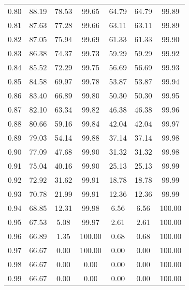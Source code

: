 \begin{tabular}{|c|c|c|c|c|c|c|}
      0.80 &     88.19 &     78.53 &      99.65 &   64.79 &      64.79 &         99.89 \\
      0.81 &     87.63 &     77.28 &      99.66 &   63.11 &      63.11 &         99.89 \\
      0.82 &     87.05 &     75.94 &      99.69 &   61.33 &      61.33 &         99.90 \\
      0.83 &     86.38 &     74.37 &      99.73 &   59.29 &      59.29 &         99.92 \\
      0.84 &     85.52 &     72.29 &      99.75 &   56.69 &      56.69 &         99.93 \\
      0.85 &     84.58 &     69.97 &      99.78 &   53.87 &      53.87 &         99.94 \\
      0.86 &     83.40 &     66.89 &      99.80 &   50.30 &      50.30 &         99.95 \\
      0.87 &     82.10 &     63.34 &      99.82 &   46.38 &      46.38 &         99.96 \\
      0.88 &     80.66 &     59.16 &      99.84 &   42.04 &      42.04 &         99.97 \\
      0.89 &     79.03 &     54.14 &      99.88 &   37.14 &      37.14 &         99.98 \\
      0.90 &     77.09 &     47.68 &      99.90 &   31.32 &      31.32 &         99.98 \\
      0.91 &     75.04 &     40.16 &      99.90 &   25.13 &      25.13 &         99.99 \\
      0.92 &     72.92 &     31.62 &      99.91 &   18.78 &      18.78 &         99.99 \\
      0.93 &     70.78 &     21.99 &      99.91 &   12.36 &      12.36 &         99.99 \\
      0.94 &     68.85 &     12.31 &      99.98 &    6.56 &       6.56 &        100.00 \\
      0.95 &     67.53 &      5.08 &      99.97 &    2.61 &       2.61 &        100.00 \\
      0.96 &     66.89 &      1.35 &     100.00 &    0.68 &       0.68 &        100.00 \\
      0.97 &     66.67 &      0.00 &     100.00 &    0.00 &       0.00 &        100.00 \\
      0.98 &     66.67 &      0.00 &       0.00 &    0.00 &       0.00 &        100.00 \\
      0.99 &     66.67 &      0.00 &       0.00 &    0.00 &       0.00 &        100.00 \\
\bottomrule
\end{tabular}
